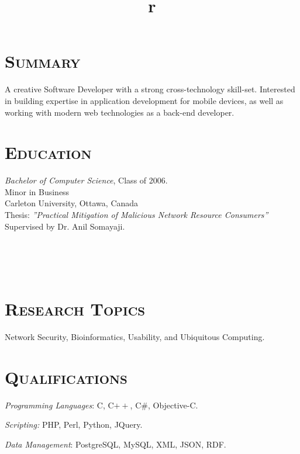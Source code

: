 \begin{resume}


\section{\textsc{Summary}}
A creative Software Developer with a strong cross-technology skill-set. Interested in building expertise in application development for mobile devices, as well as working with modern web technologies as a back-end developer.

\section{\textsc{Education}}

\textit{Bachelor of Computer Science}, Class of 2006. \\
Minor in Business \\
Carleton University, Ottawa, Canada \\
Thesis: \textit{''Practical Mitigation of Malicious Network Resource Consumers''} \\
Supervised by Dr. Anil Somayaji. 


\begin{formatb}
  \title{r}\\
  \\
  \body\\
\end{formatb}

\section{\textsc{Research Topics}}

Network Security, Bioinformatics, Usability, and Ubiquitous Computing.

\section{\textsc{Qualifications}}

\emph{Programming Languages}: C, C$++$, C\#, Objective-C.

\emph{Scripting:} PHP, Perl, Python, JQuery.

\emph{Data Management}: PostgreSQL, MySQL, XML, JSON, RDF.


\end{resume}
